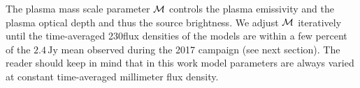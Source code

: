 
The plasma mass scale parameter $\mathcal{M}$ controls the plasma emissivity and the plasma optical depth and thus the source brightness.  We adjust $\mathcal{M}$ iteratively until the time-averaged 230\GHz flux densities of the models are within a few percent of the $2.4\,\mathrm{Jy}$ mean observed during the 2017 campaign (see next section).  The reader should keep in mind that in this work model parameters are always varied at constant time-averaged millimeter flux density.



